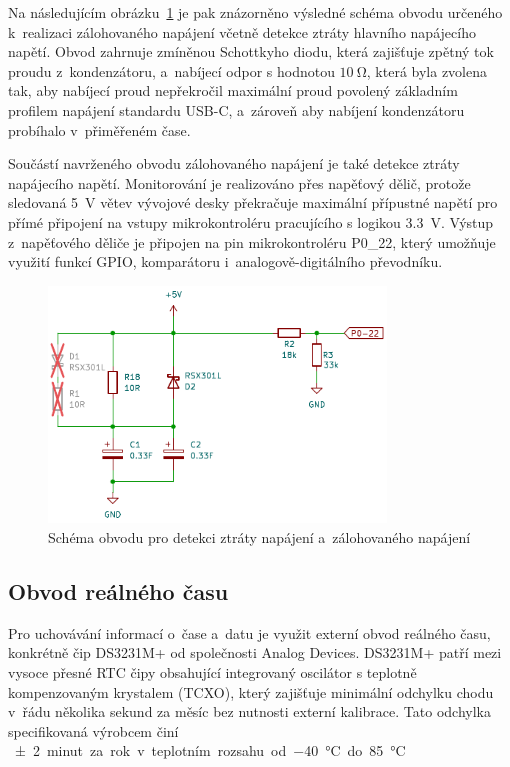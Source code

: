 Na následujícím obrázku~\ref{fig:backup-power} je pak znázorněno výsledné schéma obvodu určeného k~realizaci zálohovaného napájení včetně detekce ztráty hlavního napájecího napětí. Obvod zahrnuje zmíněnou Schottkyho diodu, která zajišťuje zpětný tok proudu z~kondenzátoru, a~nabíjecí odpor s hodnotou $\SI{10}{\ohm}$, která byla zvolena tak, aby nabíjecí proud nepřekročil maximální proud povolený základním profilem napájení standardu USB-C, a~zároveň aby nabíjení kondenzátoru probíhalo v~přiměřeném čase.

\newpage

Součástí navrženého obvodu zálohovaného napájení je také detekce ztráty napájecího napětí. Monitorování je realizováno přes napěťový dělič, protože sledovaná \SI{5}{\volt} větev vývojové desky překračuje maximální přípustné napětí pro přímé připojení na vstupy mikrokontroléru pracujícího s logikou \SI{3.3}{\volt}. Výstup z~napěťového děliče je připojen na pin mikrokontroléru P0\_22, který umožňuje využití funkcí GPIO, komparátoru i~analogově-digitálního převodníku.

\begin{figure}[h]
    \centering
    \includegraphics[width=0.80\textwidth]{obrazky-figures/backup-power.pdf}
    
    \caption{Schéma obvodu pro detekci ztráty napájení a~zálohovaného napájení}
    \label{fig:backup-power}
\end{figure}

\newpage

\subsection{Obvod reálného času}
Pro uchovávání informací o~čase a~datu je využit externí obvod reálného času, konkrétně čip DS3231M+ od společnosti Analog Devices. DS3231M+ patří mezi vysoce přesné RTC čipy obsahující integrovaný oscilátor s teplotně kompenzovaným krystalem (TCXO), který zajišťuje minimální odchylku chodu v~řádu několika sekund za měsíc bez nutnosti externí kalibrace. Tato odchylka specifikovaná výrobcem činí \SI{\pm2} minut za rok v~teplotním rozsahu od \SI{-40}{\degreeCelsius} do \SI{+85}{\degreeCelsius}.~\cite{DS3231_manual}

